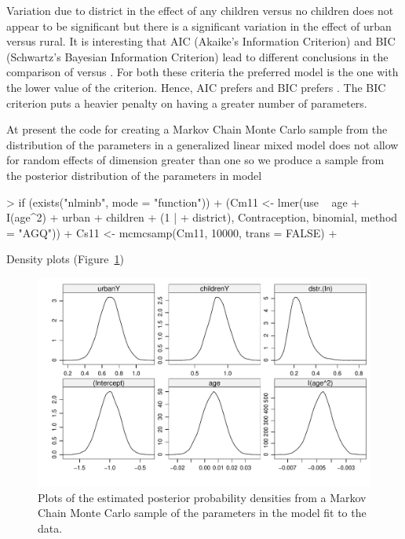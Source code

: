 \documentclass[12pt]{article}
\begin{document}
Variation due to district in the effect of any children versus no
children does not appear to be significant but there is a significant
variation in the effect of urban versus rural.  It is interesting that
AIC (Akaike's Information Criterion) and BIC (Schwartz's Bayesian
Information Criterion) lead to different conclusions in the comparison
of  versus .  For both these criteria the
preferred model is the one with the lower value of the criterion.
Hence, AIC prefers  and BIC prefers .  The BIC
criterion puts a heavier penalty on having a greater number of parameters.

At present the code for creating a Markov Chain Monte Carlo sample
from the distribution of the parameters in a generalized linear mixed
model does not allow for random effects of dimension greater than one
so we produce a sample from the posterior distribution of the
parameters in model 
\begin{Schunk}
\begin{Sinput}
> if (exists("nlminb", mode = "function")) {
+     (Cm11 <- lmer(use ~ age + I(age^2) + urban + children + (1 | 
+         district), Contraception, binomial, method = "AGQ"))
+     Cs11 <- mcmcsamp(Cm11, 10000, trans = FALSE)
+ }
\end{Sinput}
\end{Schunk}
Density plots (Figure~\ref{fig:Contra2})
\begin{figure}[tbp]
  \centering
  \includegraphics[width=\textwidth]{figs/SoftRev-Contra2}
  \caption{Plots of the estimated posterior probability densities from
    a Markov Chain Monte Carlo sample of the parameters in the model
     fit to the  data.} 
  \label{fig:Contra2}
\end{figure}
\end{document}
